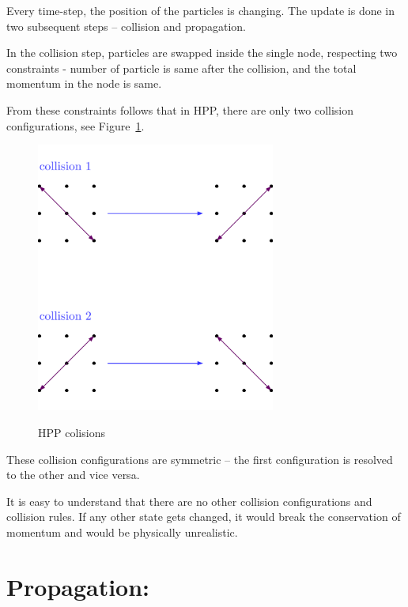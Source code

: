 Every time-step, the position of the particles is changing. The update is done in two subsequent steps -- collision and propagation.

In the collision step, particles are swapped inside the single node, respecting two constraints - number of particle is same after the collision, and the total momentum in the node is same.

From these constraints follows that in HPP, there are only two collision configurations, see Figure~\ref{hpp-colision}.

\begin{figure}[H]
 \centering
 \includegraphics[width=0.7\textwidth]{./img/hpp_col}
 \label{hpp-colision}
 \caption{HPP colisions}
\end{figure}

These collision configurations are symmetric -- the first configuration is resolved to the other and vice versa.

It is easy to understand that there are no other collision configurations and collision rules. If any other state gets changed, it would break the conservation of momentum and would be physically unrealistic.

\section{Propagation:}

